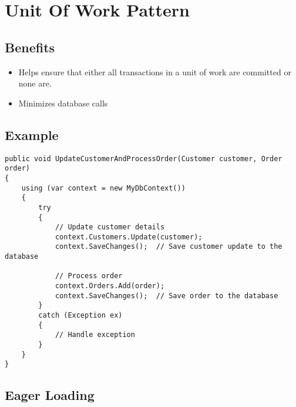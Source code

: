 \chapter{Unit Of Work Pattern}

\section{Benefits}
\begin{itemize}
    \item Helps ensure that either all transactions in a unit of work are committed or none are.
    \item Minimizes database calls
\end{itemize}

\section{Example}

\begin{lstlisting}
public void UpdateCustomerAndProcessOrder(Customer customer, Order order)
{
    using (var context = new MyDbContext())
    {
        try
        {
            // Update customer details
            context.Customers.Update(customer);
            context.SaveChanges();  // Save customer update to the database

            // Process order
            context.Orders.Add(order);
            context.SaveChanges();  // Save order to the database
        }
        catch (Exception ex)
        {
            // Handle exception
        }
    }
}
\end{lstlisting}
\section{Eager Loading}